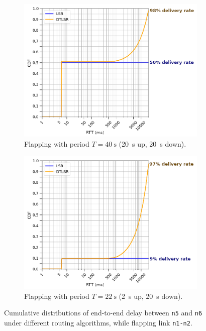 \documentclass[withindex,glossary,openany]{cam-thesis}
\begin{document}
\begin{figure}
\centering
\begin{subfigure}{.8\textwidth}
  \centering
  \includegraphics[width=1\linewidth]{delay_partition_flap20}
  \caption{Flapping with period $T=\SI{40}{\s}$ (\SI{20}{\s} up, \SI{20}{\s} down).}
  \label{fig:partition_20}
\end{subfigure}

\begin{subfigure}{.8\textwidth}
  \centering
  \includegraphics[width=1\linewidth]{delay_partition_flap2_20}
  \caption{Flapping with period $T=\SI{22}{\s}$ (\SI{2}{\s} up, \SI{20}{\s} down).}
  \label{fig:partition_2_20}
\end{subfigure}

\caption{Cumulative distributions of end-to-end delay between \texttt{n5} and \texttt{n6} under different routing algorithms, while flapping link \texttt{n1-n2}.}
\label{fig:partition}
\end{figure}
\end{document}
